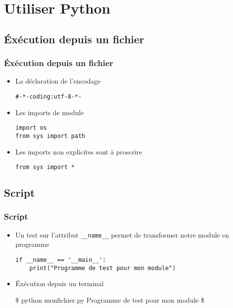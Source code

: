 \section{Utiliser Python}

\subsection{Éxécution depuis un fichier}
\begin{frame}[fragile]
  \frametitle{Éxécution depuis un fichier}
  \begin{itemize}
  \item La déclaration de l'encodage
  \begin{lstlisting}
#-*-coding:utf-8-*-
  \end{lstlisting}
  \pause
  \item Les imports de module
  \begin{lstlisting}
import os
from sys import path
  \end{lstlisting}
  \item Les imports non explicites sont à proscrire
  \begin{lstlisting}
from sys import *
  \end{lstlisting}
  \end{itemize}
\end{frame}

\subsection{Script}
\begin{frame}[fragile]
  \frametitle{Script}
  \begin{itemize}
  \item Un test sur l'attribut \verb=__name__=  permet de transformer notre module en programme
  \begin{lstlisting}
if __name__ == '__main__':
    print("Programme de test pour mon module")
  \end{lstlisting}
  \item Éxécution depuis un terminal
    \begin{terminal}
\$ python monfichier.py
Programme de test pour mon module
\$
    \end{terminal}
  \end{itemize}
\end{frame}

